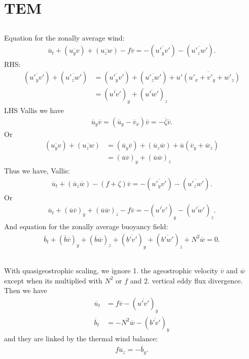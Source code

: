 \documentclass[11pt,letterpaper]{book}
\theoremstyle{definition}
\begin{document}
\section{TEM}

\subsection{}
Equation for the zonally average wind:
\begin{align*}
    \overline{u}_t + (\overline{u_y v})+(\overline{u_z w}) -f\overline{v} = -(\overline{u'_yv'})-(\overline{u'_zw'}).
\end{align*}
RHS:
\begin{align*}
    (\overline{u'_yv'})+(\overline{u'_zw'}) &= (\overline{u'_yv'})+(\overline{u'_zw'})+\overline{u'(u'_x+v'_y+w'_z)}\\
    &= (\overline{u'v'})_y+(\overline{u'w'})_z
\end{align*}
LHS Vallis we have
\begin{align*}
    \overline{u}_y\overline{v} = (\overline{u}_y-\overline{v}_x)\overline{v} = -\overline{\zeta}\overline{v}.
\end{align*}
Or
\begin{align*}
    (\overline{u_y v})+(\overline{u_z w}) &= (\overline{u}_y\overline{v})+(\overline{u}_z\overline{w})+\overline{u}(\overline{v}_y+\overline{w}_z)\\
    &= (\overline{u}\overline{v})_y+(\overline{u}\overline{w})_z
\end{align*}
Thus we have, Vallis:
\begin{align*}
    \overline{u}_t + (\overline{u}_z\overline{w})-(f+\zeta)\overline{v}=-(\overline{u'_yv'})-(\overline{u'_zw'}).
\end{align*}
Or
\begin{align*}
\overline{u}_t + (\overline{u}\overline{v})_y+(\overline{u}\overline{w})_z-f\overline{v} = -(\overline{u'v'})_y-(\overline{u'w'})_z.
\end{align*}
And equation for the zonally average buoyancy field:
\begin{align*}
\overline{b}_t + (\overline{b}\overline{v})_y+(\overline{b}\overline{w})_z+(\overline{b'v'})_y+(\overline{b'w'})_z+N^2\overline{w} = 0.
\end{align*}

\subsection{}
With quasigeostrophic scaling, we ignore 1. the ageostrophic velocity $\overline{v}$ and $\overline{w}$ except when its multiplied with $N^2$ or $f$ and 2. vertical eddy flux divergence. Then we have
\begin{align*}
\overline{u}_t &= f\overline{v}-(\overline{u'v'})_y\\
\overline{b}_t &= -N^2\overline{w}-(\overline{b'v'})_y
\end{align*}
and they are linked by the thermal wind balance:
\begin{align*}
f\overline{u}_z = -\overline{b}_y.
\end{align*}
\end{document}

